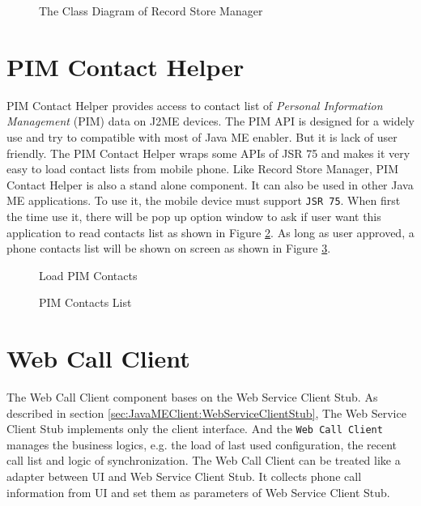 \begin{figure}[!hbtp]
\centering
{}
\caption{The Class Diagram of Record Store Manager}
\label{fig:TheClassDiagramofRecordStoreManager}
\end{figure}

\section{PIM Contact Helper}
\label{sec:JavaMEClient:PIMContactHelper}

\textsf{PIM Contact Helper} provides access to contact list of \textit{Personal Information Management} (PIM) data on J2ME devices. The PIM API is designed for a widely use and try to compatible with most of Java ME enabler. But it is lack of user friendly. The PIM Contact Helper wraps some APIs of JSR 75 and makes it very easy to load contact lists from mobile phone. Like \textsf{Record Store Manager}, \textsf{PIM Contact Helper} is also a stand alone component. It can also be used in other Java ME applications. To use it, the mobile device must support \texttt{JSR 75}\cite{JSR75}. When first the time use it, there will be pop up option window to ask if user want this application to read contacts list as shown in Figure \ref{fig:LoadPIMContacts}. As long as user approved, a phone contacts list will be shown on screen as shown in Figure \ref{fig:PIMContactsList}.  


\begin{figure}[!hbtp]
\centering
{}
\caption{Load PIM Contacts}
\label{fig:LoadPIMContacts}
\end{figure}


\begin{figure}[!hbtp]
\centering
{}
\caption{PIM Contacts List}
\label{fig:PIMContactsList}
\end{figure}

\section{Web Call Client}
\label{sec:JavaMEClient:WebCallClient}

The \textsf{Web Call Client} component bases on the \textsf{Web Service Client Stub}. As described in section \ref{sec:JavaMEClient:WebServiceClientStub}, The \textsf{Web Service Client Stub} implements only the client interface. And the \texttt{Web Call Client} manages the business logics, e.g. the load of last used configuration, the recent call list and logic of synchronization. The Web Call Client can be treated like a adapter between UI and Web Service Client Stub. It collects phone call information from UI and set them as parameters of Web Service Client Stub.

